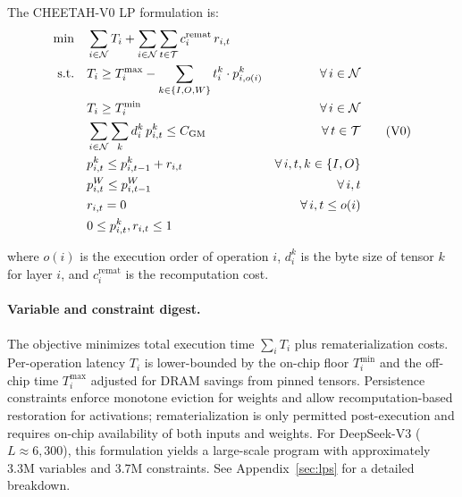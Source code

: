 The CHEETAH-V0 LP formulation is:
\begin{equation}
\begin{aligned}
\min \quad & \sum_{i \in \mathcal{N}} T_i + \sum_{i \in \mathcal{N}} \sum_{t \in \mathcal{T}} c_i^{\text{remat}} \, r_{i,t} \\
\text{s.t.} \quad
& T_i \geq T^{\max}_i - \sum_{k \in \{I,O,W\}} t_i^k \cdot p_{i,o(i)}^k & \forall\, i \in \mathcal{N} \\
& T_i \geq T^{\min}_i & \forall\, i \in \mathcal{N} \\
& \sum_{i \in \mathcal{N}} \sum_{k} d_i^k \, p_{i,t}^k \leq C_{\text{GM}} & \forall\, t \in \mathcal{T} \\
& p_{i,t}^k \leq p_{i,t-1}^k + r_{i,t} & \forall\, i, t, k \in \{I,O\} \\
& p_{i,t}^W \leq p_{i,t-1}^W & \forall\, i, t \\
& r_{i,t} = 0 & \forall\, i, t \leq o(i) \\
& 0 \leq p_{i,t}^k, r_{i,t} \leq 1 &
\end{aligned}
\tag{V0}\label{eq:v0}
\end{equation}


where $o(i)$ is the execution order of operation $i$, $d_i^k$ is the byte size of tensor $k$ for layer $i$, and $c_i^{\text{remat}}$ is the recomputation cost.

\paragraph{Variable and constraint digest.}
The objective minimizes total execution time $\sum_i T_i$ plus rematerialization costs. Per-operation latency $T_i$ is lower-bounded by the on-chip floor $T_i^{\min}$ and the off-chip time $T_i^{\max}$ adjusted for DRAM savings from pinned tensors. Persistence constraints enforce monotone eviction for weights and allow recomputation-based restoration for activations; rematerialization is only permitted post-execution and requires on-chip availability of both inputs and weights.
For DeepSeek-V3 ($L \approx 6{,}300$), this formulation yields a large-scale program with approximately 3.3M variables and 3.7M constraints. See Appendix~\ref{sec:lps} for a detailed breakdown. 


